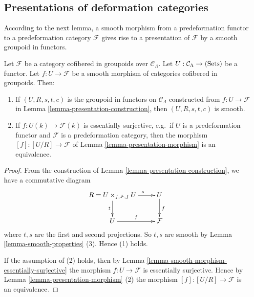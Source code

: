 \subsection{Presentations of deformation categories}
\label{subsection-presentation-deformation-categories}

\noindent
According to the next lemma, a smooth morphism from a predeformation functor to 
a predeformation category $\mathcal F$ gives rise to a presentation of 
$\mathcal F$ by a smooth groupoid in functors.

\begin{lemma}
\label{lemma-smooth-groupoid-in-functors-construction}
Let $\mathcal F$ be a category cofibered in groupoids over $\mathcal 
C_{\Lambda}$.  Let $U: \mathcal C_{\Lambda} \rightarrow \textnormal{(Sets)}$ be 
a functor.  Let $f: U \rightarrow \mathcal F$ be a smooth morphism of 
categories cofibered in groupoids. Then:
\begin{enumerate}
\item If $(U,R,s,t,c)$ is the groupoid in functors on $\mathcal C_{\Lambda}$ 
constructed from $f: U \rightarrow \mathcal F$ in Lemma 
\ref{lemma-presentation-construction}, then $(U,R,s,t,c)$ is smooth. 
\item If $f: U(k) \rightarrow \mathcal F(k)$ is essentially surjective, e.g.\ 
if $U$ is a predeformation functor and $\mathcal F$ is a predeformation 
category, then the morphism $[f]: [U/R] \rightarrow \mathcal F$ of Lemma 
\ref{lemma-presentation-morphism} is an equivalence.
\end{enumerate}
\end{lemma}

\begin{proof}
From the construction of Lemma \ref{lemma-presentation-construction}, we have a 
commutative diagram
\[
\xymatrix{
R = U \times_{f,\mathcal F, f} U \ar[r]^{\hspace{7mm} s} \ar[d]_{t} & U 
\ar[d]^{f} \\
U \ar[r]^{f} & \mathcal F
}
\]
where $t,s$ are the first and second projections.  So $t,s$ are smooth by Lemma 
\ref{lemma-smooth-properties} (3).  Hence (1) holds.

\medskip \noindent
If the assumption of (2) holds, then by Lemma 
\ref{lemma-smooth-morphism-essentially-surjective} the morphism $f: U 
\rightarrow \mathcal F$ is essentially surjective. Hence by Lemma 
\ref{lemma-presentation-morphism} (2) the morphism $[f]: [U/R] \rightarrow 
\mathcal F$ is an equivalence.
\end{proof}

